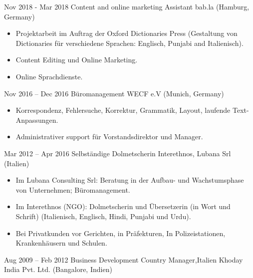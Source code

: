 \documentclass[a4paper,]{fortysecondscv}
\begin{document}
\begin{cvtable}[4]
		\cvitem
			{Nov 2018 - Mar 2018}
			{Content and online marketing Assistant}
			{bab.la  (Hamburg, Germany)}
			{
				\vspace{-\topsep}
				\begin{itemize}[nosep, leftmargin=0pt] %
					\item Projektarbeit im Auftrag der Oxford Dictionaries Press (Gestaltung von Dictionaries für verschiedene Sprachen: Englisch, Punjabi and Italienisch). 
					\item Content Editing und Online Marketing.
					\item Online Sprachdienste.
				\end{itemize}
			}
		\cvitem
			{Nov 2016 -- Dec 2016}
			{Büromanagement}
			{WECF e.V (Munich, Germany)}
			{
				\vspace{-\topsep}
				\begin{itemize}[nosep, leftmargin=0pt] %
  					\item Korrespondenz, Fehlersuche, Korrektur, Grammatik, Layout, laufende Text-Anpassungen. 				  
  					\item Administrativer support für Vorstandsdirektor und Manager.
				\end{itemize}
			}
		\cvitem
			{Mar 2012 -- Apr 2016}
			{Selbständige Dolmetscherin}
			{Interethnos, Lubana Srl (Italien)}
			{				
				\vspace{-\topsep}
				\begin{itemize}[nosep, leftmargin=0pt] %
					\item Im Lubana Consulting Srl: Beratung in der Aufbau- und Wachstumsphase von Unternehmen; Büromanagement.
					\item Im Interethnos (NGO): Dolmetscherin und Übersetzerin (in Wort und Schrift) (Italienisch, Englisch, Hindi, Punjabi und Urdu).
					\item Bei Privatkunden vor Gerichten, in Präfekturen, In Polizeistationen, Krankenhäusern und Schulen.
				\end{itemize}
			}
		\cvitem
			{Aug 2009 -- Feb 2012}
			{Business Development Country Manager,Italien}
			{Khoday India Pvt. Ltd. (Bangalore, Indien)}
			{
				\begin{itemize}[nosep, leftmargin=0pt] %

\end{itemize}}
\end{cvtable}
\end{document}
